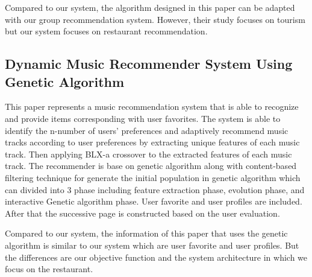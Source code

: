 \documentclass[12pt,oneside,openright,a4paper]{cpe-english-project}
\begin{document}
Compared to our system, the algorithm designed in this paper can be adapted with our group recommendation system. However, their study focuses on tourism but our system focuses on restaurant recommendation.

\subsection{Dynamic Music Recommender System Using Genetic Algorithm}

This paper represents a music recommendation system that is able to recognize and provide items corresponding with user favorites. The system is able to identify the n-number of users' preferences and adaptively recommend music tracks according to user preferences by extracting unique features of each music track. Then applying BLX-a crossover to the extracted features of each music track. \cite{MusicRecommender} The recommender is base on genetic algorithm along with content-based filtering technique for generate the initial population in genetic algorithm which can divided into 3 phase including feature extraction phase, evolution phase, and interactive Genetic algorithm phase. User favorite and user profiles are included. After that the successive page is constructed based on the user evaluation.

Compared to our system, the information of this paper that uses the genetic algorithm is similar to our system which are user favorite and user profiles. But the differences are our objective function and the system architecture in which we focus on the restaurant.


\end{document}
